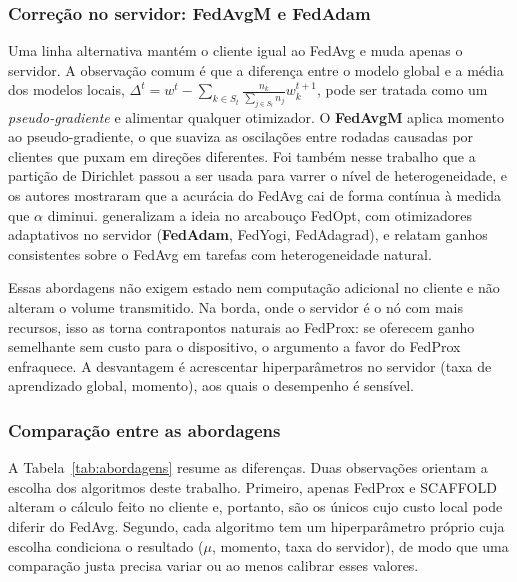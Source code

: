 \subsubsection{Correção no servidor: FedAvgM e FedAdam}

Uma linha alternativa mantém o cliente igual ao FedAvg e muda apenas o servidor. A observação comum é que a diferença entre o modelo global e a média dos modelos locais, $\Delta^t = w^t - \sum_{k \in S_t} \frac{n_k}{\sum_{j\in S_t} n_j} w_k^{t+1}$, pode ser tratada como um \emph{pseudo-gradiente} e alimentar qualquer otimizador. O \textbf{FedAvgM} \citep{hsu2019fedavgm} aplica momento ao pseudo-gradiente, o que suaviza as oscilações entre rodadas causadas por clientes que puxam em direções diferentes. Foi também nesse trabalho que a partição de Dirichlet passou a ser usada para varrer o nível de heterogeneidade, e os autores mostraram que a acurácia do FedAvg cai de forma contínua à medida que $\alpha$ diminui. \citet{reddi2021adaptive} generalizam a ideia no arcabouço FedOpt, com otimizadores adaptativos no servidor (\textbf{FedAdam}, FedYogi, FedAdagrad), e relatam ganhos consistentes sobre o FedAvg em tarefas com heterogeneidade natural.

Essas abordagens não exigem estado nem computação adicional no cliente e não alteram o volume transmitido. Na borda, onde o servidor é o nó com mais recursos, isso as torna contrapontos naturais ao FedProx: se oferecem ganho semelhante sem custo para o dispositivo, o argumento a favor do FedProx enfraquece. A desvantagem é acrescentar hiperparâmetros no servidor (taxa de aprendizado global, momento), aos quais o desempenho é sensível.

\subsubsection{Comparação entre as abordagens}

A Tabela~\ref{tab:abordagens} resume as diferenças. Duas observações orientam a escolha dos algoritmos deste trabalho. Primeiro, apenas FedProx e SCAFFOLD alteram o cálculo feito no cliente e, portanto, são os únicos cujo custo local pode diferir do FedAvg. Segundo, cada algoritmo tem um hiperparâmetro próprio cuja escolha condiciona o resultado ($\mu$, momento, taxa do servidor), de modo que uma comparação justa precisa variar ou ao menos calibrar esses valores.


